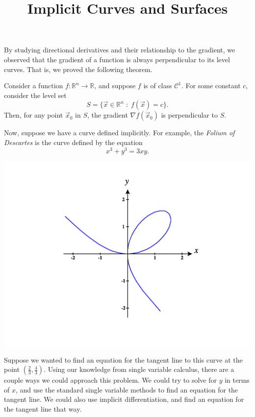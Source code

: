 \documentclass{ximera}
\title{Implicit Curves and Surfaces}
\begin{document}
\begin{abstract}
\end{abstract}
\maketitle

By studying directional derivatives and their relationship to the gradient, we observed that the gradient of a function is always perpendicular to its level curves.  That is, we proved the following theorem.

\begin{theorem}
Consider a function $f:\mathbb{R}^n\rightarrow\mathbb{R}$, and suppose $f$ is of class $\mathcal{C}^1$. For some constant $c$, consider the level set
\[
S = \{\vec{x}\in\mathbb{R}^n\;:\;f(\vec{x})=c\}.
\]
Then, for any point $\vec{x}_0$ in $S$, the gradient $\nabla f(\vec{x}_0)$ is perpendicular to $S$.
\end{theorem}

Now, suppose we have a curve defined implicitly. For example, the \emph{Folium of Descartes} is the curve defined by the equation
\[
x^3+y^3=3xy.
\]

\begin{image}
\includegraphics[width = \textwidth]{CalcPlot3D-folium}
\end{image}

Suppose we wanted to find an equation for the tangent line to this curve at the point $\left(\frac{2}{3}, \frac{4}{3}\right)$. Using our knowledge from single variable calculus, there are a couple ways we could approach this problem. We could try to solve for $y$ in terms of $x$, and use the standard single variable methods to find an equation for the tangent line. We could also use implicit differentiation, and find an equation for the tangent line that way.
\end{document}
